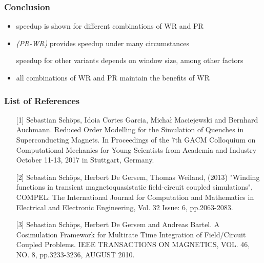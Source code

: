 \documentclass[colorbacktitle,inverttitle,landscape,presentation,
	english,
	aspectratio=43, %
	accentcolor=tud9b, %
]{tudbeamer}
\begin{document}

\begin{frame}
\frametitle{Conclusion}
	\begin{itemize}
	\item speedup is shown for different combinations of WR and PR
	
	\item \textit{(PR-WR)} provides speedup under many circumstances
	
	speedup for other variants depends on window size, among other factors
	
	\item all combinations of WR and PR maintain the benefits of WR
	\end{itemize}
\end{frame}


\begin{frame}
\frametitle{List of References}
	\begin{enumerate}
	\item[{[1]}]
Sebastian Schöps, Idoia Cortes Garcia, Michał Maciejewski and Bernhard
Auchmann. Reduced Order Modelling for the Simulation of Quenches in
Superconducting Magnets. In Proceedings of the 7th GACM Colloquium on
Computational Mechanics for Young Scientists from Academia and Industry
October 11-13, 2017 in Stuttgart, Germany.

	\item[{[2]}]
Sebastian Schöps, Herbert De Gersem, Thomas Weiland, (2013) "Winding
functions in transient magnetoquasistatic field-circuit coupled simulations",
COMPEL: The International Journal for Computation and Mathematics in
Electrical and Electronic Engineering, Vol. 32 Issue: 6, pp.2063-2083.

	\item[{[3]}]
Sebastian Schöps, Herbert De Gersem and Andreas Bartel. A
Cosimulation Framework for Multirate Time Integration of Field/Circuit
Coupled Problems. IEEE TRANSACTIONS ON MAGNETICS, VOL. 46,
NO. 8, pp.3233-3236, AUGUST 2010.
	\end{enumerate}
\end{frame}
\end{document}

